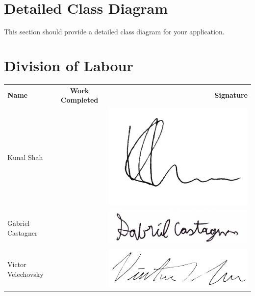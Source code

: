\documentclass[]{article}
\begin{document}
\section{Detailed Class Diagram}
\label{sec:detailed_class_diagram}
This section should provide a detailed class diagram for your application.

\newpage

\appendix
\section{Division of Labour}
\label{sec:division_of_labour}
\begin{tabular}{l c r}
	\textbf{Name} & \textbf{Work Completed} & \textbf{Signature} \\
	
	Kunal Shah &  & 
	\includegraphics[scale=0.2]{../Resources/Signature/Kunal-Sig.png} \\
	
	Gabriel Castagner &  &
	\includegraphics[scale=0.2]{../Resources/Signature/Gabe-Sig.png} \\
	
	Victor Velechovsky &  & 
	\includegraphics[scale=0.3]{../Resources/Signature/Vic-Sig.png} \\
	

\end{tabular}
\end{document}
